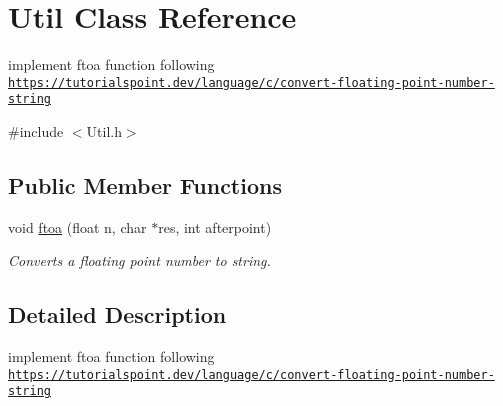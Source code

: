 \hypertarget{class_util}{}\section{Util Class Reference}
\label{class_util}


implement ftoa function following \href{https://tutorialspoint.dev/language/c/convert-floating-point-number-string}{\tt https\+://tutorialspoint.\+dev/language/c/convert-\/floating-\/point-\/number-\/string}  




{\ttfamily \#include $<$Util.\+h$>$}

\subsection*{Public Member Functions}
\begin{DoxyCompactItemize}
\item 
\mbox{\label{class_util_a8ea9ed5f2cf51bfe78c5c87bf326d3de}} 
void \hyperlink{class_util_a8ea9ed5f2cf51bfe78c5c87bf326d3de}{ftoa} (float n, char $\ast$res, int afterpoint)
\begin{DoxyCompactList}\small\item\em Converts a floating point number to string. \end{DoxyCompactList}\end{DoxyCompactItemize}


\subsection{Detailed Description}
implement ftoa function following \href{https://tutorialspoint.dev/language/c/convert-floating-point-number-string}{\tt https\+://tutorialspoint.\+dev/language/c/convert-\/floating-\/point-\/number-\/string} 

